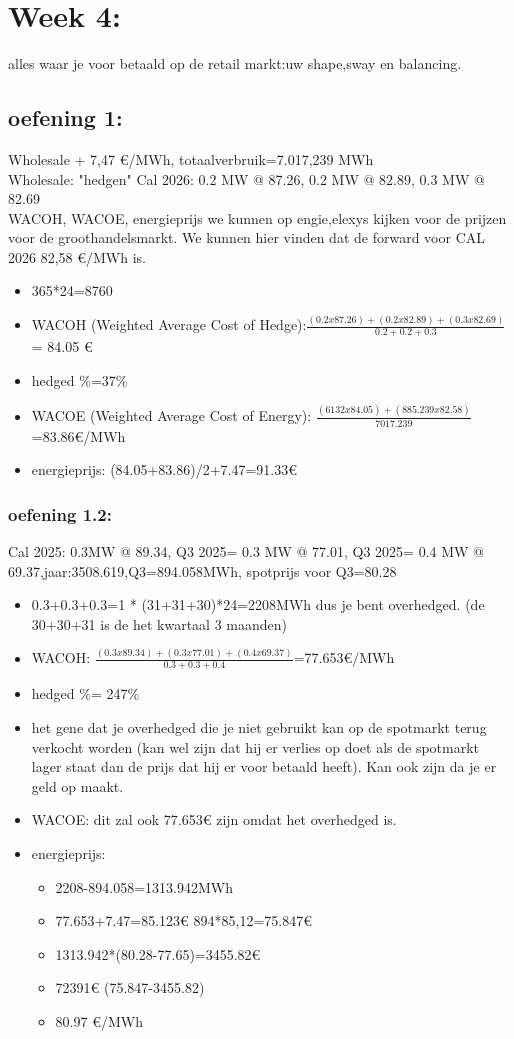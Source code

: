 \documentclass[12pt]{article}
\begin{document}
\section{Week 4:}
alles waar je voor betaald op de retail markt:uw shape,sway en balancing.
\subsection{oefening 1:}
Wholesale + 7,47 €/MWh, totaalverbruik=7.017,239 MWh \\  
Wholesale: "hedgen" Cal 2026: 0.2 MW @ 87.26, 0.2 MW @ 82.89, 0.3 MW @ 82.69 \\ 
WACOH, WACOE, energieprijs
we kunnen op engie,elexys kijken voor de prijzen voor de groothandelsmarkt. We kunnen hier vinden dat de forward voor CAL 2026 82,58 €/MWh is.\begin{itemize}
    \item 365*24=8760
    \item WACOH (Weighted Average Cost of Hedge):$\frac{(0.2x87.26)+(0.2x82.89)+(0.3x82.69)}{0.2+0.2+0.3}$ = 84.05 €
    \item hedged \%=37\%
    \item WACOE (Weighted Average Cost of Energy): $\frac{(6132x84.05)+(885.239x82.58)}{7017.239}$=83.86€/MWh
    \item energieprijs: (84.05+83.86)/2+7.47=91.33€
\end{itemize}
\subsubsection{oefening 1.2:}
Cal 2025: 0.3MW @ 89.34, Q3 2025= 0.3 MW @ 77.01, Q3 2025= 0.4 MW @ 69.37,jaar:3508.619,Q3=894.058MWh, spotprijs voor Q3=80.28\begin{itemize}
    \item 0.3+0.3+0.3=1 * (31+31+30)*24=2208MWh dus je bent overhedged. (de 30+30+31 is de het kwartaal 3 maanden)
    \item WACOH: $\frac{(0.3 x 89.34)+(0.3x77.01)+(0.4x69.37)}{0.3+0.3+0.4}$=77.653€/MWh
    \item hedged \%= 247\%
    \item het gene dat je overhedged die je niet gebruikt kan op de spotmarkt terug verkocht worden (kan wel zijn dat hij er verlies op doet als de spotmarkt lager staat dan de prijs dat hij er voor betaald heeft). Kan ook zijn da je er geld op maakt.
    \item WACOE: dit zal ook 77.653€ zijn omdat het overhedged is.
    \item energieprijs: \begin{itemize}
        \item 2208-894.058=1313.942MWh
        \item 77.653+7.47=85.123€ 894*85,12=75.847€
        \item 1313.942*(80.28-77.65)=3455.82€
        \item 72391€ (75.847-3455.82)
        \item 80.97 €/MWh
    \end{itemize}
\end{itemize}
\end{document}
